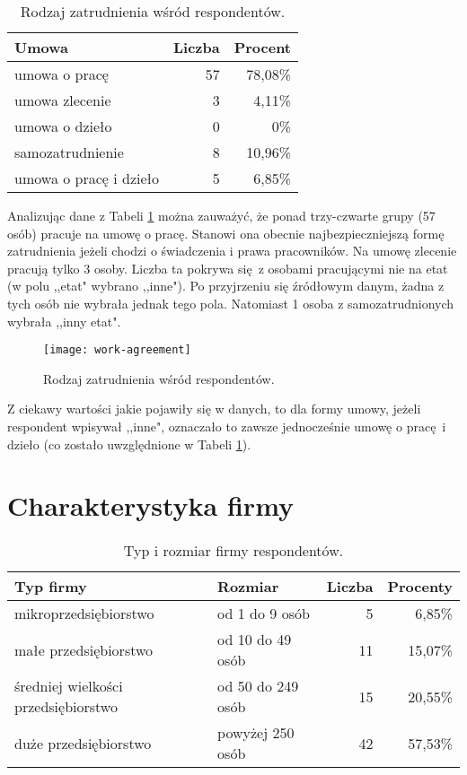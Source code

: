 \begin{table}[h!]
\begin{center}
\begin{tabular}{l r r}
Umowa & Liczba & Procent \\ \hline
umowa o pracę & 57 & 78,08\% \\
umowa zlecenie & 3 & 4,11\% \\
umowa o dzieło & 0 & 0\% \\
samozatrudnienie & 8 & 10,96\% \\
umowa o pracę i dzieło & 5 & 6,85\% \\
\end{tabular}
\end{center}
\caption{Rodzaj zatrudnienia wśród respondentów.}
\label{tab:work-time-stats}
\end{table}

Analizując dane z Tabeli \ref{tab:work-time-stats} można zauważyć, że ponad trzy-czwarte grupy (57 osób) pracuje na umowę o pracę. Stanowi ona obecnie najbezpieczniejszą formę zatrudnienia jeżeli chodzi o świadczenia i prawa pracowników. Na umowę zlecenie pracują tylko 3 osoby. Liczba ta pokrywa się z osobami pracującymi nie na etat (w polu ,,etat" wybrano ,,inne"). Po przyjrzeniu się źródłowym danym, żadna z tych osób nie wybrała jednak tego pola. Natomiast 1 osoba z
samozatrudnionych wybrała ,,inny etat". 

\begin{figure}[htb]
\begin{center}
\texttt{[image: work-agreement]}
\end{center}
\caption{Rodzaj zatrudnienia wśród respondentów.}
\label{fig:work-agreement}
\end{figure}

Z ciekawy wartości jakie pojawiły się w danych, to dla formy umowy, jeżeli respondent wpisywał ,,inne", oznaczało to zawsze jednocześnie umowę o pracę i dzieło (co zostało uwzględnione w Tabeli \ref{tab:work-time-stats}).

\section{Charakterystyka firmy}

\begin{table}[h!]
\begin{center}
\begin{tabular}{l l r r}
Typ firmy & Rozmiar & Liczba & Procenty \\ \hline
mikroprzedsiębiorstwo & od 1 do 9 osób & 5 & 6,85\% \\
małe przedsiębiorstwo & od 10 do 49 osób & 11 & 15,07\% \\
średniej wielkości przedsiębiorstwo & od 50 do 249 osób & 15 & 20,55\% \\
duże przedsiębiorstwo & powyżej 250 osób & 42 & 57,53\% \\
\end{tabular}
\end{center}
\caption{Typ i rozmiar firmy respondentów.}
\label{tab:company-size}
\end{table}

